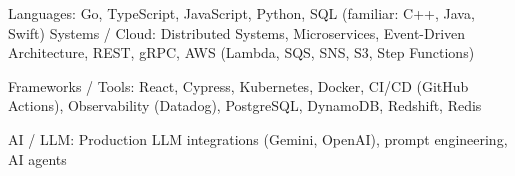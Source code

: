 

\begin{cvskills}

  \cvskill
    {Languages:}
    {Go, TypeScript, JavaScript, Python, SQL (familiar: C++, Java, Swift)}
  \cvskill
    {Systems / Cloud:}
    {Distributed Systems, Microservices, Event-Driven Architecture, REST, gRPC, AWS (Lambda, SQS, SNS, S3, Step Functions)}

  \cvskill
    {Frameworks / Tools:}
    {React, Cypress, Kubernetes, Docker, CI/CD (GitHub Actions), Observability (Datadog), PostgreSQL, DynamoDB, Redshift, Redis}

  \cvskill
    {AI / LLM:}
    {Production LLM integrations (Gemini, OpenAI), prompt engineering, AI agents}

\end{cvskills}
